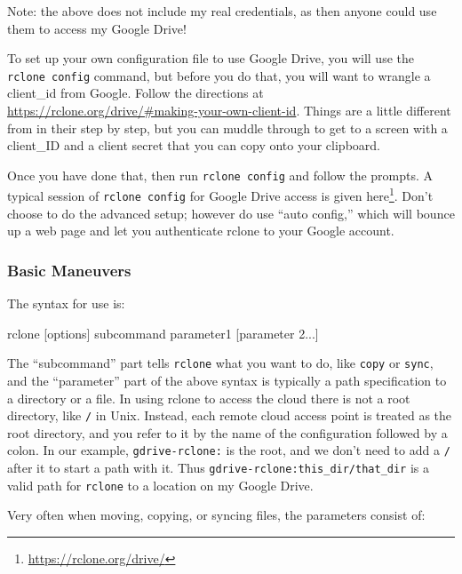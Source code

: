 \documentclass[]{krantz}
\makeatletter
\newenvironment{Shaded}{\begin{snugshade}}{\end{snugshade}}
\newcommand{\ExtensionTok}[1]{#1}
\newcommand{\NormalTok}[1]{#1}
\renewcommand{\href}[2]{#2\footnote{\url{#1}}}
\newenvironment{kframe}{%
\medskip{}
\setlength{\fboxsep}{.8em}
 \def\at@end@of@kframe{}%
 \ifinner\ifhmode%
  \def\at@end@of@kframe{\end{minipage}}%
  \begin{minipage}{\columnwidth}%
 \fi\fi%
 \def\FrameCommand##1{\hskip\@totalleftmargin \hskip-\fboxsep
 \colorbox{shadecolor}{##1}\hskip-\fboxsep
     \hskip-\linewidth \hskip-\@totalleftmargin \hskip\columnwidth}%
 \MakeFramed {\advance\hsize-\width
   \@totalleftmargin\z@ \linewidth\hsize
   \@setminipage}}%
 {\par\unskip\endMakeFramed%
 \at@end@of@kframe}
\renewenvironment{Shaded}{\begin{kframe}}{\end{kframe}}
\makeatother
\begin{document}
Note: the above does not include my
real credentials, as then anyone could use them to access my Google Drive!

To set up your own configuration file to use Google Drive, you will use the \texttt{rclone\ config}
command, but before you do that, you will want to wrangle a client\_id from Google. Follow
the directions at \url{https://rclone.org/drive/\#making-your-own-client-id}. Things are a little different from in their step
by step, but you can muddle through to get to a screen with a client\_ID and a client
secret that you can copy onto your clipboard.

Once you have done that, then run \texttt{rclone\ config} and follow the prompts. A
typical session of \texttt{rclone\ config} for Google Drive access is given
\href{https://rclone.org/drive/}{here}. Don't choose to do the advanced setup; however
do use ``auto config,'' which will bounce up a web page and let you authenticate rclone
to your Google account.

\hypertarget{basic-maneuvers}{%
\subsubsection{Basic Maneuvers}\label{basic-maneuvers}}

The syntax for use is:

\begin{Shaded}
\begin{Highlighting}[]
\ExtensionTok{rclone}\NormalTok{ [options] subcommand  parameter1 [parameter 2...]}
\end{Highlighting}
\end{Shaded}

The ``subcommand'' part tells \texttt{rclone} what you want to do, like \texttt{copy} or \texttt{sync}, and
the ``parameter'' part of the above syntax is typically a path
specification to a directory or a file. In using rclone to access the
cloud there is not a root directory, like \texttt{/} in Unix. Instead, each remote
cloud access point is treated as the root directory, and you refer to it
by the name of the configuration followed by a colon. In our example,
\texttt{gdrive-rclone:} is the root, and we don't need to add a \texttt{/} after it to
start a path with it. Thus \texttt{gdrive-rclone:this\_dir/that\_dir} is a
valid path for \texttt{rclone} to a location on my Google Drive.

Very often when moving, copying, or syncing files, the parameters
consist of:
\end{document}
